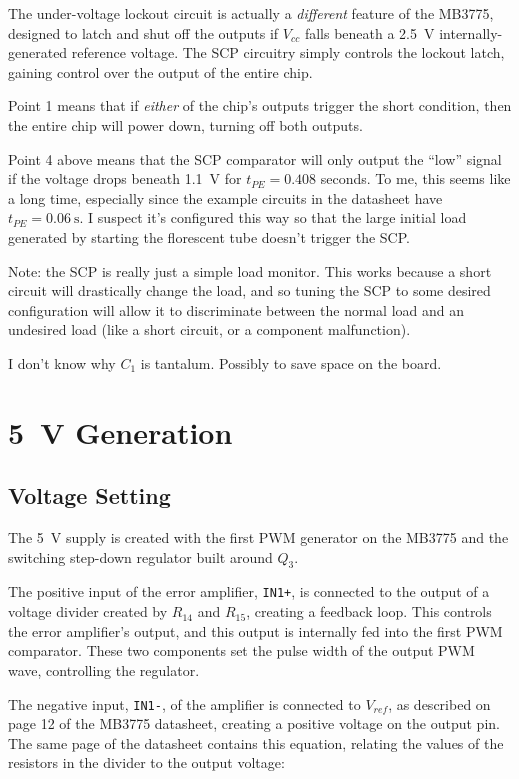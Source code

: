 \documentclass{article}
\newcommand{\Vcc}{$V_{cc}$}
\newcommand{\Vref}{$V_{ref}$}
\newcommand{\chippin}{\texttt}
\newcommand{\model}{\textsf}
\begin{document}
The under-voltage lockout circuit is actually a \emph{different}
feature of the \model{MB3775}, designed to latch and shut off the
outputs if \Vcc{} falls beneath a \qty{2.5}{\volt}
internally-generated reference voltage. The SCP circuitry simply
controls the lockout latch, gaining control over the output of the
entire chip.

Point 1 means that if \emph{either} of the chip's outputs trigger the
short condition, then the entire chip will power down, turning off
both outputs.

Point 4 above means that the SCP comparator will only output the
``low'' signal if the voltage drops beneath \qty{1.1}{\volt} for
$t_{PE} = 0.408$ seconds. To me, this seems like a long time,
especially since the example circuits in the datasheet have
$t_{PE} = \qty{0.06}{\second}$. I suspect it's configured this way so
that the large initial load generated by starting the florescent tube
doesn't trigger the SCP.

Note: the SCP is really just a simple load monitor. This works because
a short circuit will drastically change the load, and so tuning the
SCP to some desired configuration will allow it to discriminate
between the normal load and an undesired load (like a short circuit, or
a component malfunction).

I don't know why $C_1$ is tantalum. Possibly to save space on the board.

\section{\qty{5}{\volt} Generation}
\subsection{Voltage Setting}
The \qty{5}{\volt} supply is created with the first PWM generator on
the \model{MB3775} and the switching step-down regulator built around
$Q_3$.

The positive input of the error amplifier, \chippin{IN1+}, is
connected to the output of a voltage divider created by $R_{14}$ and
$R_{15}$, creating a feedback loop. This controls the error
amplifier's output, and this output is internally fed into the first
PWM comparator. These two components set the pulse width of the output
PWM wave, controlling the regulator.

The negative input, \chippin{IN1-}, of the amplifier is connected to
\Vref, as described on page 12 of the \model{MB3775} datasheet, creating a
positive voltage on the output pin. The same page of the datasheet
contains this equation, relating the values of the resistors in the
divider to the output voltage:
\end{document}

